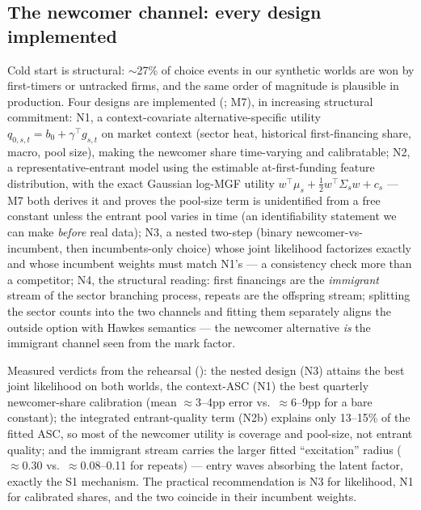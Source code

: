 \subsection{The newcomer channel: every design implemented}
\label{sec:design_newcomer}

Cold start is structural: $\sim$27\% of choice events in our synthetic worlds
are won by first-timers or untracked firms, and the same order of magnitude is
plausible in production. Four designs are implemented (; M7), in
increasing structural commitment:
N1, a context-covariate alternative-specific utility
$q_{0,s,t}=b_0+\gamma^\top g_{s,t}$ on market context (sector heat, historical
first-financing share, macro, pool size), making the newcomer share
time-varying and calibratable;
N2, a representative-entrant model using the estimable at-first-funding feature
distribution, with the exact Gaussian log-MGF utility
$w^\top\mu_s+\tfrac12 w^\top\Sigma_s w+c_s$ --- M7 both derives it and proves
the pool-size term is unidentified from a free constant unless the entrant pool
varies in time (an identifiability statement we can make \emph{before} real
data);
N3, a nested two-step (binary newcomer-vs-incumbent, then incumbents-only
choice) whose joint likelihood factorizes exactly and whose incumbent weights
must match N1's --- a consistency check more than a competitor;
N4, the structural reading: first financings are the \emph{immigrant} stream of
the sector branching process, repeats are the offspring stream; splitting the
sector counts into the two channels and fitting them separately aligns the
outside option with Hawkes semantics --- the newcomer alternative \emph{is} the
immigrant channel seen from the mark factor.

Measured verdicts from the rehearsal (): the nested design (N3)
attains the best joint likelihood on both worlds, the context-ASC (N1) the best
quarterly newcomer-share calibration (mean $\approx$3--4pp error vs.\
$\approx$6--9pp for a bare constant); the integrated entrant-quality term (N2b)
explains only 13--15\% of the fitted ASC, so most of the newcomer utility is
coverage and pool-size, not entrant quality; and the immigrant stream carries
the larger fitted ``excitation'' radius ($\approx$0.30 vs.\ $\approx$0.08--0.11
for repeats) --- entry waves absorbing the latent factor, exactly the S1
mechanism. The practical recommendation is N3 for likelihood, N1 for
calibrated shares, and the two coincide in their incumbent weights.

